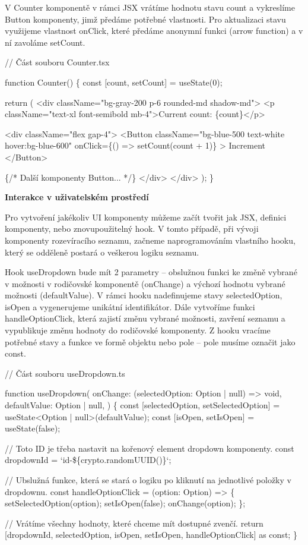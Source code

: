 V Counter komponentě v rámci JSX vrátíme hodnotu stavu count a vykreslíme Button komponenty, jimž předáme potřebné vlastnosti. 
Pro aktualizaci stavu využijeme vlastnost onClick, které předáme anonymní funkci (arrow function) a v ní zavoláme setCount.

\begin{prog}
// Část souboru Counter.tsx

function Counter() \{
  const [count, setCount] = useState(0);

  return (
    <div className="bg-gray-200 p-6 rounded-md shadow-md">
      <p className="text-xl font-semibold mb-4">Current count: \{count\}</p>

      <div className="flex gap-4">
        <Button
          className="bg-blue-500 text-white hover:bg-blue-600"
          onClick=\{() => setCount(count + 1)\}
        >
          Increment
        </Button>

        \{/* Další komponenty Button... */\}
      </div>
    </div>
  );
\}
\end{prog}

\begin{flushleft}
  \textbf{Interakce v uživatelském prostředí}
\end{flushleft}

Pro vytvoření jakékoliv UI komponenty můžeme začít tvořit jak JSX, definici komponenty, nebo znovupoužitelný hook. 
V tomto případě, při vývoji komponenty rozevíracího seznamu, začneme naprogramováním vlastního hooku, který se odděleně postará o veškerou logiku seznamu.

Hook useDropdown bude mít 2 parametry -- obslužnou funkci ke změně vybrané v možnosti v rodičovské komponentě (onChange) a výchozí hodnotu vybrané možnosti (defaultValue). 
V rámci hooku nadefinujeme stavy selectedOption, isOpen a vygenerujeme unikátní identifikátor. 
Dále vytvoříme funkci handleOptionClick, která zajistí změnu vybrané možnosti, zavření seznamu a vypublikuje změnu hodnoty do rodičovské komponenty. 
Z hooku vracíme potřebné stavy a funkce ve formě objektu nebo pole -- pole musíme označit jako const.

\begin{prog}
// Část souboru useDropdown.ts

function useDropdown(
  onChange: (selectedOption: Option | null) => void,
  defaultValue: Option | null,
) \{
  const [selectedOption, setSelectedOption] 
    = useState<Option | null>(defaultValue);
  const [isOpen, setIsOpen] = useState(false);

  // Toto ID je třeba nastavit na kořenový element dropdown komponenty.
  const dropdownId = `id-\$\{crypto.randomUUID()\}`;

  // Ubslužná funkce, která se stará o logiku
    po kliknutí na jednotlivé položky v dropdownu.
  const handleOptionClick = (option: Option) => \{
    setSelectedOption(option);
    setIsOpen(false);
    onChange(option);
  \};

  // Vrátíme všechny hodnoty, které chceme mít dostupné zvenčí.
  return [dropdownId, selectedOption, 
    isOpen, setIsOpen, handleOptionClick] as const;
\}
\end{prog}

